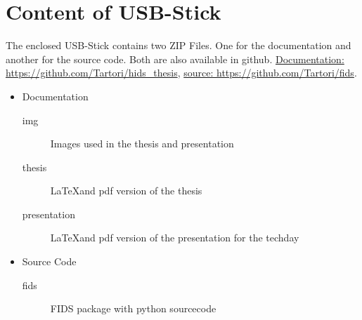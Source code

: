 \chapter{Content of USB-Stick}
\label{chap:appendix_CDROM}

The enclosed USB-Stick contains two ZIP Files. One for the documentation and another for the source code. Both are also available in github. \href{https://github.com/Tartori/hids\_thesis}{Documentation: https://github.com/Tartori/hids\_thesis}, \href{https://github.com/Tartori/fids}{source: https://github.com/Tartori/fids}.

\begin{itemize}
  \item Documentation
  \begin{description}
    \item [img] Images used in the thesis and presentation
    \item [thesis] \LaTeX and pdf version of the thesis
    \item [presentation] \LaTeX and pdf version of the presentation for the techday
  \end{description}
  \item Source Code
  \begin{description}
    \item [fids] FIDS package with python sourcecode
  \end{description}
\end{itemize}